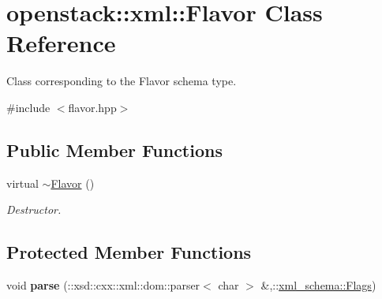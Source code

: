 \hypertarget{classopenstack_1_1xml_1_1Flavor}{
\section{openstack::xml::Flavor Class Reference}
\label{classopenstack_1_1xml_1_1Flavor}
}


Class corresponding to the Flavor schema type.  




{\ttfamily \#include $<$flavor.hpp$>$}

\subsection*{Public Member Functions}
\begin{DoxyCompactItemize}
\item 
\hypertarget{classopenstack_1_1xml_1_1Flavor_a7140cb4a5dcc69e68b8d8e2a23de0345}{
virtual \hyperlink{classopenstack_1_1xml_1_1Flavor_a7140cb4a5dcc69e68b8d8e2a23de0345}{$\sim$Flavor} ()}
\label{classopenstack_1_1xml_1_1Flavor_a7140cb4a5dcc69e68b8d8e2a23de0345}

\begin{DoxyCompactList}\small\item\em Destructor. \item\end{DoxyCompactList}\end{DoxyCompactItemize}
\subsection*{Protected Member Functions}
\begin{DoxyCompactItemize}
\item 
\hypertarget{classopenstack_1_1xml_1_1Flavor_a228fb1050047bd5d5d153fc769eed678}{
void {\bfseries parse} (::xsd::cxx::xml::dom::parser$<$ char $>$ \&,::\hyperlink{namespacexml__schema_affb4c227cbd9aa7453dd1dc5a1401943}{xml\_\-schema::Flags})}
\label{classopenstack_1_1xml_1_1Flavor_a228fb1050047bd5d5d153fc769eed678}

\end{DoxyCompactItemize}
